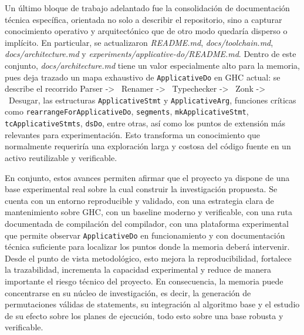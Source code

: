 Un último bloque de trabajo adelantado fue la consolidación de documentación técnica específica, orientada no solo a describir el repositorio, sino a capturar conocimiento operativo y arquitectónico que de otro modo quedaría disperso o implícito. En particular, se actualizaron \textit{README.md}, \textit{docs/toolchain.md}, \textit{docs/architecture.md} y \textit{experiments/applicative-do/README.md}. Dentro de este conjunto, \textit{docs/architecture.md} tiene un valor especialmente alto para la memoria, pues deja trazado un mapa exhaustivo de \texttt{ApplicativeDo} en \textsf{GHC} actual: se describe el recorrido Parser -> \ Renamer -> \ Typechecker -> \ Zonk -> \ Desugar, las estructuras \texttt{ApplicativeStmt} y \texttt{ApplicativeArg}, funciones críticas como \texttt{rearrangeForApplicativeDo}, \texttt{segments}, \texttt{mkApplicativeStmt}, \texttt{tcApplicativeStmts}, \texttt{dsDo}, entre otras, así como los puntos de extensión más relevantes para experimentación. Esto transforma un conocimiento que normalmente requeriría una exploración larga y costosa del código fuente en un activo reutilizable y verificable.

En conjunto, estos avances permiten afirmar que el proyecto ya dispone de una base experimental real sobre la cual construir la investigación propuesta. Se cuenta con un entorno reproducible y validado, con una estrategia clara de mantenimiento sobre \textsf{GHC}, con un baseline moderno y verificable, con una ruta documentada de compilación del compilador, con una plataforma experimental que permite observar \texttt{ApplicativeDo} en funcionamiento y con documentación técnica suficiente para localizar los puntos donde la memoria deberá intervenir. Desde el punto de vista metodológico, esto mejora la reproducibilidad, fortalece la trazabilidad, incrementa la capacidad experimental y reduce de manera importante el riesgo técnico del proyecto. En consecuencia, la memoria puede concentrarse en su núcleo de investigación, es decir, la generación de permutaciones válidas de statements, su integración al algoritmo base y el estudio de su efecto sobre los planes de ejecución, todo esto sobre una base robusta y verificable.




\newpage

